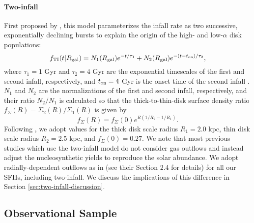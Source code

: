 \documentclass[twocolumn,twocolappendix]{aastex631}
\begin{document}
\paragraph{Two-infall} First proposed by \citet{Chiappini1997-TwoInfall}, this model parameterizes the infall rate as two successive, exponentially declining bursts to explain the origin of the high- and low-$\alpha$ disk populations:
\begin{equation}
    \label{eq:twoinfall-ifr}
    f_{\rm TI}(t|R_{\rm gal}) = N_1(R_{\rm gal}) e^{-t/\tau_1} + N_2(R_{\rm gal}) e^{-(t-t_{\rm on})/\tau_2},
\end{equation}
where $\tau_1=1$ Gyr and $\tau_2=4$ Gyr are the exponential timescales of the first and second infall, respectively, and $t_{\rm on}=4$ Gyr is the onset time of the second infall \citep[based on typical values in, e.g.,][]{Chiappini1997-TwoInfall,Spitoni2020-TwoInfall,Spitoni2021-TwoInfall}. $N_1$ and $N_2$ are the normalizations of the first and second infall, respectively, and their ratio $N_2/N_1$ is calculated so that the thick-to-thin-disk surface density ratio $f_\Sigma(R)=\Sigma_2(R)/\Sigma_1(R)$ is given by
\begin{equation}
    f_\Sigma(R) = f_\Sigma(0) e^{R(1/R_2 - 1/R_1)}.
\end{equation}
Following \citet{BlandHawthornGerhard2016-MilkyWayReview}, we adopt values for the thick disk scale radius $R_1=2.0$ kpc, thin disk scale radius $R_2=2.5$ kpc, and $f_\Sigma(0)=0.27$.
We note that most previous studies which use the two-infall model \citep[e.g.,][]{Chiappini1997-TwoInfall,Matteucci2006-BimodalDTDConsequences,Matteucci2009-DTDModels,Spitoni2019-TwoInfall} do not consider gas outflows and instead adjust the nucleosynthetic yields to reproduce the solar abundance. We adopt radially-dependent outflows as in  (see their Section 2.4 for details) for all our SFHs, including two-infall. We discuss the implications of this difference in Section \ref{sec:two-infall-discussion}.

\subsection{Observational Sample}
\label{sec:observational-sample}
\end{document}
